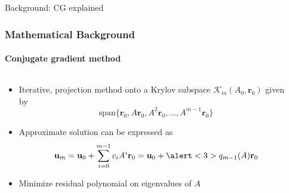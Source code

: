 \footerinfootnotesfalse
\begin{frame}[label=background,fragile]{Background: CG explained}
    \frametitle{Mathematical Background}
    \framesubtitle{Conjugate gradient method}
    \begin{columns}[T,onlytextwidth]
        \begin{column}{.5\textwidth}
            \begin{itemize}
                \item<+-> Iterative, projection method onto a Krylov subspace $\mathcal{K}_m(A_0, \mathbf{r}_0)$ given by
                \begin{equation*}
                     \text{span}\{\mathbf{r}_0, A\mathbf{r}_0, A^2\mathbf{r}_0, \dots, A^{m-1}\mathbf{r}_0\}
                \end{equation*}
                \item<+-> Approximate solution can be expressed as
                \begin{equation*}
                    \mathbf{u}_m = \mathbf{u}_0 + \sum_{i=0}^{m-1} c_i A^i \mathbf{r}_0 = \mathbf{u}_0 + \alert<3>{q_{m-1}}(A)\mathbf{r}_0
                \end{equation*}
                \item<4> Minimize residual polynomial on eigenvalues of $A$
            \end{itemize}
        \end{column}
        \begin{column}{.5\textwidth}
        \end{column}
    \end{columns}
\end{frame}

